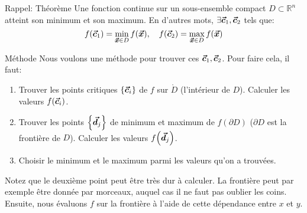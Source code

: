 \documentclass[a4paper]{article}
\begin{document}
\begin{parag}{Rappel: Théorème}
    Une fonction continue sur un sous-ensemble compact $D \subset \mathbb{R}^n$ atteint son minimum et son maximum. En d'autres mots, $\exists \bm{\protect\vec{c}}_1, \bm{\protect\vec{c}}_2$ tels que: 
    \[f\left(\bvec{c}_1\right) = \min_{\bvec{x} \in D} f\left(\bvec{x}\right), \mathspace f\left(\bvec{c}_2\right) = \max_{\bvec{x} \in D} f\left(\bvec{x}\right)\]
\end{parag}

\begin{parag}{Méthode}
    Nous voulons une méthode pour trouver ces $\bm{\protect\vec{c}}_1, \bm{\protect\vec{c}}_2$. Pour faire cela, il faut:
    \begin{enumerate}
        \item Trouver les points critiques $\left\{\bvec{c}_i\right\}$ de $f$ sur $\mathring{D}$ (l'intérieur de $D$). Calculer les valeurs $f\left(\bvec{c}_i\right)$.
        \item Trouver les points $\left\{\bvec{d}_j\right\}$ de minimum et maximum de $f\left(\partial D\right)$ ($\partial D$ est la frontière de $D$). Calculer les valeurs $f\left(\bvec{d}_j\right)$.
        \item Choisir le minimum et le maximum parmi les valeurs qu'on a trouvées.
    \end{enumerate}

    Notez que le deuxième point peut être très dur à calculer. La frontière peut par exemple être donnée par morceaux, auquel cas il ne faut pas oublier les coins. Ensuite, nous évaluons $f$ sur la frontière à l'aide de cette dépendance entre $x$ et $y$.
\end{parag}
\end{document}
